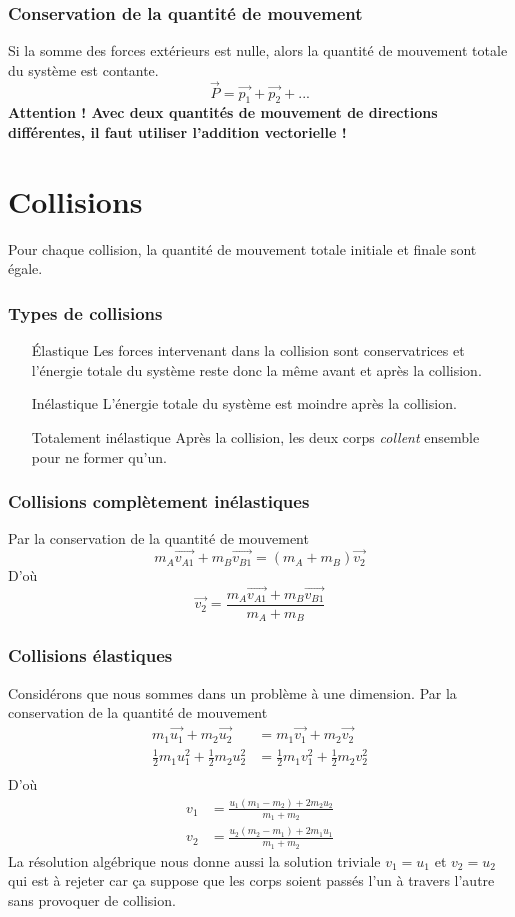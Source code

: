 \section{Conservation de la quantité de mouvement}
Si la somme des forces extérieurs est nulle, alors la quantité de mouvement totale du système est contante.
\[ \vec{P} = \vec{p_1} + \vec{p_2} + ... \]
{ \bf Attention ! Avec deux quantités de mouvement de directions différentes, il faut utiliser l'addition vectorielle !}

\part{Collisions}
Pour chaque collision, la quantité de mouvement totale initiale et finale sont égale.
\section{Types de collisions}
\begin{itemize}
	\item [Élastique]
		Les forces intervenant dans la collision sont conservatrices et l'énergie totale du système reste donc la même avant et après la collision.
	\item [Inélastique]
		L'énergie totale du système est moindre après la collision.
	\item [Totalement inélastique]
		Après la collision, les deux corps \emph{collent} ensemble pour ne former qu'un.
\end{itemize}

\section{Collisions complètement inélastiques}
Par la conservation de la quantité de mouvement
\[ m_A\vec{v_{A1}} + m_B\vec{v_{B1}} = (m_A + m_B)\vec{v_2} \]
D'où
\[ \vec{v_{2}} = \frac{m_A\vec{v_{A1}} + m_B\vec{v_{B1}}}{m_A + m_B} \]

\section{Collisions élastiques}
Considérons que nous sommes dans un problème à une dimension.
Par la conservation de la quantité de mouvement
\begin{align*}
	m_1\vec{u_1} + m_2\vec{u_2} &= m_1\vec{v_1} +  m_2\vec{v_{2}}\\
	\frac{1}{2}m_1u_{1}^2 + \frac{1}{2}m_2u_{2}^2 &= \frac{1}{2}m_1v_{1}^2 + \frac{1}{2}m_2v_{2}^2\\
\end{align*}
D'où
\begin{align*}
	v_1 &= \frac{u_1(m_1 - m_2) + 2m_2u_2}{m_1 + m_2}\\
	v_2 &= \frac{u_2(m_2 - m_1) + 2m_1u_1}{m_1 + m_2}
\end{align*}
La résolution algébrique nous donne aussi la solution triviale
$v_1 = u_1$ et $v_2 = u_2$ qui est à rejeter car ça suppose que les corps soient passés l'un à travers l'autre sans provoquer de collision.

